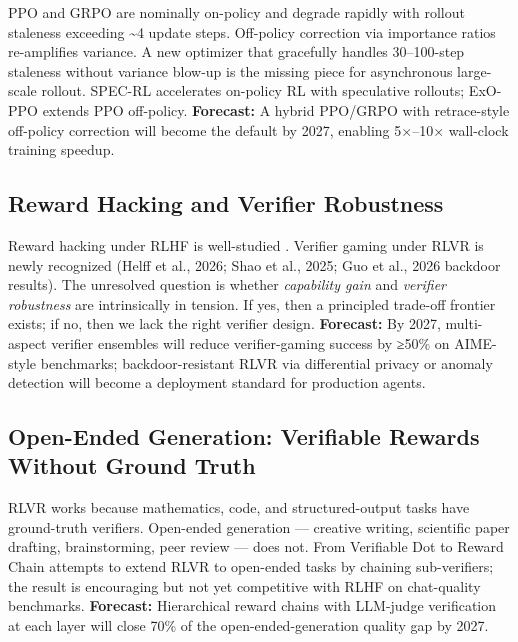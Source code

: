 \documentclass{article}
\begin{document}
PPO and GRPO are nominally on-policy and degrade rapidly with rollout staleness exceeding \textasciitilde4 update steps. Off-policy correction via importance ratios re-amplifies variance. A new optimizer that gracefully handles 30--100-step staleness without variance blow-up is the missing piece for asynchronous large-scale rollout. SPEC-RL \citep{liu20252025} accelerates on-policy RL with speculative rollouts; ExO-PPO \citep{wang20262026} extends PPO off-policy. \textbf{Forecast:} A hybrid PPO/GRPO with retrace-style off-policy correction will become the default by 2027, enabling 5×--10× wall-clock training speedup.

\subsection{Reward Hacking and Verifier Robustness}\label{reward-hacking-and-verifier-robustness}

Reward hacking under RLHF is well-studied \citep{casper20232023}. Verifier gaming under RLVR is newly recognized (Helff et al., 2026; Shao et al., 2025; Guo et al., 2026 backdoor results). The unresolved question is whether \emph{capability gain} and \emph{verifier robustness} are intrinsically in tension. If yes, then a principled trade-off frontier exists; if no, then we lack the right verifier design. \textbf{Forecast:} By 2027, multi-aspect verifier ensembles will reduce verifier-gaming success by ≥50\% on AIME-style benchmarks; backdoor-resistant RLVR via differential privacy or anomaly detection will become a deployment standard for production agents.

\subsection{Open-Ended Generation: Verifiable Rewards Without Ground Truth}\label{open-ended-generation-verifiable-rewards-without-ground-truth}

RLVR works because mathematics, code, and structured-output tasks have ground-truth verifiers. Open-ended generation --- creative writing, scientific paper drafting, brainstorming, peer review --- does not. From Verifiable Dot to Reward Chain \citep{jiang20262026} attempts to extend RLVR to open-ended tasks by chaining sub-verifiers; the result is encouraging but not yet competitive with RLHF on chat-quality benchmarks. \textbf{Forecast:} Hierarchical reward chains with LLM-judge verification at each layer will close 70\% of the open-ended-generation quality gap by 2027.
\end{document}
